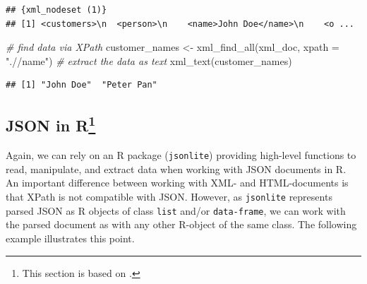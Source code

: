 \documentclass[
  12pt,
]{style/krantz}
\newenvironment{Shaded}{\begin{snugshade}}{\end{snugshade}}
\newcommand{\AttributeTok}[1]{\textcolor[rgb]{0.77,0.63,0.00}{#1}}
\newcommand{\CommentTok}[1]{\textcolor[rgb]{0.56,0.35,0.01}{\textit{#1}}}
\newcommand{\FunctionTok}[1]{\textcolor[rgb]{0.00,0.00,0.00}{#1}}
\newcommand{\NormalTok}[1]{#1}
\newcommand{\OtherTok}[1]{\textcolor[rgb]{0.56,0.35,0.01}{#1}}
\newcommand{\SpecialCharTok}[1]{\textcolor[rgb]{0.00,0.00,0.00}{#1}}
\newcommand{\StringTok}[1]{\textcolor[rgb]{0.31,0.60,0.02}{#1}}
\begin{document}
\begin{verbatim}
## {xml_nodeset (1)}
## [1] <customers>\n  <person>\n    <name>John Doe</name>\n    <o ...
\end{verbatim}

\begin{Shaded}
\begin{Highlighting}[]
\CommentTok{\# find data via XPath}
\NormalTok{customer\_names }\OtherTok{\textless{}{-}} \FunctionTok{xml\_find\_all}\NormalTok{(xml\_doc, }\AttributeTok{xpath =} \StringTok{".//name"}\NormalTok{)}
\CommentTok{\# extract the data as text}
\FunctionTok{xml\_text}\NormalTok{(customer\_names)}
\end{Highlighting}
\end{Shaded}

\begin{verbatim}
## [1] "John Doe"  "Peter Pan"
\end{verbatim}

\hypertarget{json-in-r}{%
\subsection[JSON in R]{\texorpdfstring{JSON in R\footnote{This section is based on \citet{umatter_2018b}.}}{JSON in R}}\label{json-in-r}}

Again, we can rely on an R package (\texttt{jsonlite}) providing high-level functions to read, manipulate, and extract data when working with JSON documents in R. An important difference between working with XML- and HTML-documents is that XPath is not compatible with JSON. However, as \texttt{jsonlite} represents parsed JSON as R objects of class \texttt{list} and/or \texttt{data-frame}, we can work with the parsed document as with any other R-object of the same class. The following example illustrates this point.

\begin{Shaded}
\end{Shaded}
\end{document}
